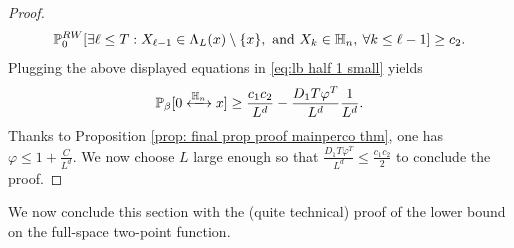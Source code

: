 \documentclass[11pt,a4paper]{article}
\numberwithin{equation}{section}
\theoremstyle{plain}
\theoremstyle{definition}
\newcommand{\connect}{\xleftrightarrow}
\begin{document}
\begin{proof}
\begin{equation}
	\mathbb P_0^{\rm RW}[\exists \ell\leq T: X_{\ell-1}\in \Lambda_{L}(x)\setminus\{x\}, \text{ and } X_k\in \mathbb H_n, \: \forall k\leq \ell-1]\geq c_2.
\end{equation}
Plugging the above displayed equations in \eqref{eq:lb half 1 small} yields
\begin{equation}
	\mathbb P_\beta[0\connect{\mathbb H_n\:}x]\geq \frac{c_1c_2}{L^d}-\frac{D_1 T\varphi^T}{L^d}\frac{1}{L^d}.
\end{equation}
Thanks to Proposition \ref{prop: final prop proof mainperco thm}, one has $\varphi\leq 1+\frac{C}{L^d}$. We now choose $L$ large enough so that $\frac{D_1 T \varphi^T}{L^d}\leq \frac{c_1c_2}{2}$ to conclude the proof.
\end{proof}

We now conclude this section with the (quite technical) proof of the lower bound on the full-space two-point function.
\end{document}
